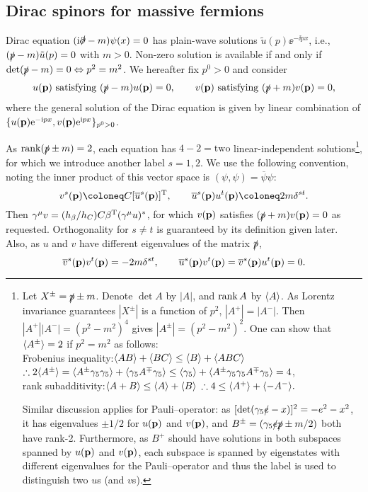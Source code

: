 \documentclass[CheatSheet]{subfiles}
\begin{document}
\subsection{Dirac spinors for massive fermions}
Dirac equation $({\mathrm{i}}\slashed{\partial}-m)\psi(x)=0$ has plain-wave solutions $\tilde u(p)\ee^{-\ii p x}$, i.e., $(\slashed{p}-m)\tilde u(p)=0$ with $m>0$.
Non-zero solution is available if and only if $\det(\slashed p-m)=0\Leftrightarrow p^2=m^2$.
We hereafter fix $p^0>0$ and consider
\begin{equation}
 u({\mathbf{p}})\text{~satisfying~}(\slashed p-m)u({\mathbf{p}})=0,
\qquad
 v({\mathbf{p}})\text{~satisfying~}(\slashed p+m)v({\mathbf{p}})=0,
\end{equation}
where the general solution of the Dirac equation is given by linear combination of $\{u({\mathbf{p}}){\mathrm{e}}^{-{\mathrm{i}} px}, v({\mathbf{p}}){\mathrm{e}}^{{\mathrm{i}} px}\}_{p^0>0}$.

As $\operatorname{\mathrm{rank}}(\slashed p\pm m)=2$, each equation has $4-2 = \text{two}$ linear-independent solutions\footnote{%
  Let $X^\pm=\slashed{p}\pm m$. Denote $\det A$ by $|A|$, and $\operatorname{\mathrm{rank}} A$ by $\langle A\rangle$.
  As Lorentz invariance guarantees $|X^\pm|$ is a function of $p^2$, $|A^+|=|A^-|$.
  Then $|A^+||A^-| = (p^2-m^2)^4$ gives $|A^\pm|=(p^2-m^2)^2$.
  One can show that $\langle A^\pm\rangle=2$ if $p^2=m^2$ as follows:
\\%
Frobenius inequality:\qquad $\langle AB\rangle+\langle BC\rangle\le \langle B\rangle + \langle ABC\rangle$\qquad
$\therefore 2\langle A^\pm\rangle=\langle A^\pm\gamma_5\gamma_5\rangle + \langle\gamma_5A^\mp\gamma_5\rangle \le \langle\gamma_5\rangle+\langle A^\pm\gamma_5\gamma_5A^\mp\gamma_5\rangle=4$,
\\%
rank subadditivity:\qquad$\langle A+B\rangle\le\langle A\rangle+\langle B\rangle$\qquad
$\therefore4\le\langle A^+\rangle+\langle-A^-\rangle.$

Similar discussion applies for Pauli--\Lubanski operator: as $[\det(\gamma_5\slashed{e}-x)]^2=-e^2-x^2$, it has eigenvalues $\pm1/2$ for $u({\mathbf{p}})$ and $v({\mathbf{p}})$, and 
$B^\pm=(\gamma_5\slashed e\slashed p\pm m/2)$ both have rank-2.
Furthermore, \TOCHECK as $B^+$ should have solutions in both subspaces spanned by $u({\mathbf{p}})$ and $v({\mathbf{p}})$, each subspace is spanned by eigenstates with different eigenvalues for the Pauli--\Lubanski operator and thus the label is used to distinguish two $u$s (and $v$s).
}, for which we introduce another label $s=1,2$.
We use the following convention, noting the inner product of this vector space is $(\psi,\psi)=\overline\psi\psi$:
\begin{equation}
 v^s(\vc p)\coloneq C[\overline{u}^s(\vc p)]^\TT,\qquad
 \overline u^s(\vc p)u^t(\vc p)\coloneq 2m\delta^{st}.
\end{equation}
Then $\gamma^\mu v = (h_\beta/h_C)C\beta^{\mathrm{T}}(\gamma^\mu u)^*$, for which $v({\mathbf{p}})$ satisfies $(\slashed{p}+m)v({\mathbf{p}})=0$ as requested.
Orthogonality for $s\neq t$ is guaranteed by its definition given later.
Also, as $u$ and $v$ have different eigenvalues of the matrix $\slashed p$,
\begin{equation}
  \overline v^s({\mathbf{p}})v^t({\mathbf{p}})=-2m\delta^{st},\qquad
 \overline u^s({\mathbf{p}})v^t({\mathbf{p}})=\overline v^s({\mathbf{p}})u^t({\mathbf{p}})=0.
\end{equation}
\end{document}
